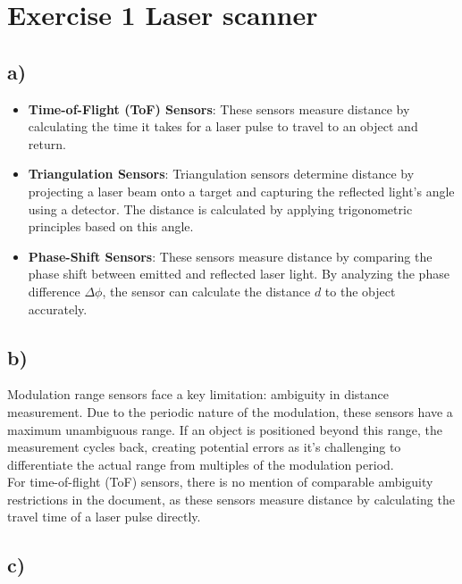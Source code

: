 \documentclass[template,12pt,a4paper,enabledeprecatedfontcommands]{template}
\begin{document}
\vspace*{-1em}

\section{Exercise 1 Laser scanner}
\subsection{a)}

\begin{itemize}
    \item \textbf{Time-of-Flight (ToF) Sensors}: These sensors measure distance by calculating the time it takes for a laser pulse to travel to an object and return.

    \item \textbf{Triangulation Sensors}: Triangulation sensors determine distance by projecting a laser beam onto a target and capturing the reflected light's angle using a detector. The distance is calculated by applying trigonometric principles based on this angle.

    \item \textbf{Phase-Shift Sensors}: These sensors measure distance by comparing the phase shift between emitted and reflected laser light. By analyzing the phase difference \(\Delta \phi\), the sensor can calculate the distance \(d\) to the object accurately.
\end{itemize}

\subsection{b)}
Modulation range sensors face a key limitation: ambiguity in distance measurement. Due to the periodic nature of the modulation, these sensors have a maximum unambiguous range. If an object is positioned beyond this range, the measurement cycles back, creating potential errors as it’s challenging to differentiate the actual range from multiples of the modulation period.\\

\noindent For time-of-flight (ToF) sensors, there is no mention of comparable ambiguity restrictions in the document, as these sensors measure distance by calculating the travel time of a laser pulse directly.

\subsection{c)}
\end{document}
